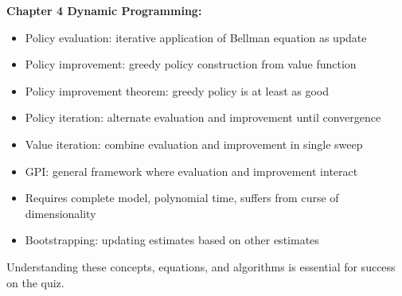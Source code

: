 \documentclass[12pt]{article}
\begin{document}
\textbf{Chapter 4 Dynamic Programming:}
\begin{itemize}
\item Policy evaluation: iterative application of Bellman equation as update
\item Policy improvement: greedy policy construction from value function
\item Policy improvement theorem: greedy policy is at least as good
\item Policy iteration: alternate evaluation and improvement until convergence
\item Value iteration: combine evaluation and improvement in single sweep
\item GPI: general framework where evaluation and improvement interact
\item Requires complete model, polynomial time, suffers from curse of dimensionality
\item Bootstrapping: updating estimates based on other estimates
\end{itemize}

Understanding these concepts, equations, and algorithms is essential for success on the quiz.
\end{document}
